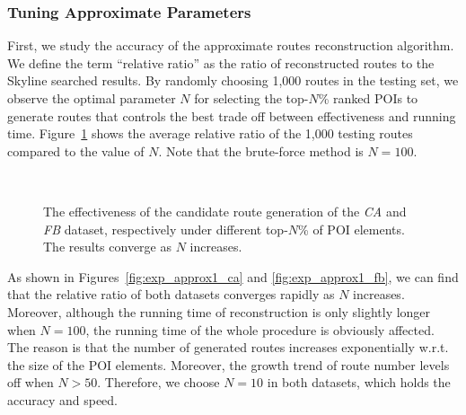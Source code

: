 \subsubsection{Tuning Approximate Parameters} \label{subsec:turing}
First, we study the accuracy of the approximate routes reconstruction algorithm. We define the term ``relative ratio'' as the ratio of reconstructed routes to the Skyline searched results. By randomly choosing 1,000 routes in the testing set, we observe the optimal parameter $N$ for selecting the top-$N$\% ranked POIs to generate routes that controls the best trade off between effectiveness and running time. Figure~\ref{fig:exp_approx} shows the average relative ratio of the 1,000 testing routes compared to the value of $N$. Note that the brute-force method is $N=100$. 

\begin{figure}[h]
\centering
\mbox{
}
\mbox{
}
\caption{The effectiveness of the candidate route generation of the \textit{CA} and \textit{FB} dataset, respectively under different top-$N$\% of POI elements. The results converge as $N$ increases.}
\label{fig:exp_approx}
\end{figure}

As shown in Figures~\ref{fig:exp_approx1_ca} and \ref{fig:exp_approx1_fb}, we can find that the relative ratio of both datasets converges rapidly as $N$ increases. Moreover, although the running time of reconstruction is only slightly longer when $N=100$, the running time of the whole procedure is obviously affected. The reason is that the number of generated routes increases exponentially w.r.t. the size of the POI elements. Moreover, the growth trend of route number levels off when $N>50$. Therefore, we choose $N=10$ in both datasets, which holds the accuracy and speed. %

